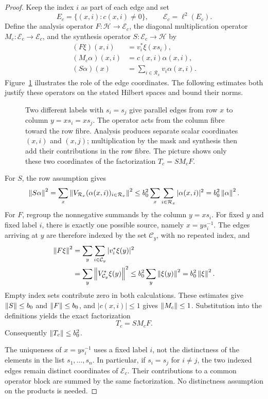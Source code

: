 \begin{proof}
Keep the index $i$ as part of each edge and set
\[
 E_c=\{(x,i):c(x,i)\ne0\},
 \qquad \mathcal E_c=\ell^2(E_c).
\]
Define the analysis operator $F\colon\mathcal H\to\mathcal E_c$,
the diagonal multiplication operator
$M_c\colon\mathcal E_c\to\mathcal E_c$, and the synthesis operator
$S\colon\mathcal E_c\to\mathcal H$ by
\begin{align*}
 (F\xi)(x,i)&=v_i^*\xi(xs_i),\\
 (M_c\alpha)(x,i)&=c(x,i)\alpha(x,i),\\
 (S\alpha)(x)&=\sum_{i\in \mathcal R_x}v_i\alpha(x,i).
\end{align*}
Figure~\ref{fig:edge-factorization} illustrates the role of the edge
coordinates. The following estimates both justify these operators on the
stated Hilbert spaces and bound their norms.
\begin{figure}[tb]
\centering

\caption{Two different labels with \(s_i=s_j\) give parallel edges from
row \(x\) to column \(y=xs_i=xs_j\). The operator acts from the column
fibre toward the row fibre. Analysis produces separate scalar
coordinates \((x,i)\) and \((x,j)\); multiplication by the mask and
synthesis then add their contributions in the row fibre. The picture
shows only these two coordinates of the factorization \(T_c=SM_cF\).}
\label{fig:edge-factorization}
\end{figure}  For $S$, the row assumption gives
\[
 \left\lVert S\alpha\right\rVert^2
 =\sum_x\left\lVert V_{\mathcal R_x}(\alpha(x,i))_{i\in \mathcal R_x}\right\rVert^2
 \le b_0^2\sum_x\sum_{i\in \mathcal R_x}|\alpha(x,i)|^2
 =b_0^2\left\lVert\alpha\right\rVert^2.
\]
For $F$, regroup the nonnegative summands by the column $y=xs_i$.
For fixed $y$ and fixed label $i$, there is exactly one possible
source, namely $x=ys_i^{-1}$.  The edges arriving at $y$ are
therefore indexed by the set $\mathcal C_y$, with no repeated index, and
\begin{align*}
 \left\lVert F\xi\right\rVert^2
 &=\sum_y\sum_{i\in \mathcal C_y}|v_i^*\xi(y)|^2\\
 &=\sum_y\left\lVert V_{\mathcal C_y}^*\xi(y)\right\rVert^2
 \le b_0^2\sum_y\left\lVert\xi(y)\right\rVert^2
 =b_0^2\left\lVert\xi\right\rVert^2.
\end{align*}
Empty index sets contribute zero in both calculations.  These
estimates give $\left\lVert S\right\rVert\le b_0$ and $\left\lVert F\right\rVert\le b_0$, and
$|c(x,i)|\le1$ gives $\left\lVert M_c\right\rVert\le1$.  Substitution into the
definitions yields the exact factorization
\[
 T_c=S M_c F.
\]
Consequently $\left\lVert T_c\right\rVert\le b_0^2$.

The uniqueness of $x=ys_i^{-1}$ uses a fixed label $i$, not the
distinctness of the elements in the list $s_1,\ldots,s_n$.
In particular, if $s_i=s_j$ for $i\ne j$, the two indexed edges remain
distinct coordinates of $\mathcal E_c$.  Their contributions to a
common operator block are summed by the same factorization.  No
distinctness assumption on the products is needed.
\end{proof}


